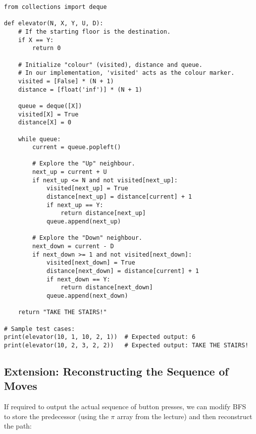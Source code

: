 \documentclass[12pt]{article}
\begin{document}
\begin{lstlisting}
from collections import deque

def elevator(N, X, Y, U, D):
    # If the starting floor is the destination.
    if X == Y:
        return 0
    
    # Initialize "colour" (visited), distance and queue.
    # In our implementation, 'visited' acts as the colour marker.
    visited = [False] * (N + 1)
    distance = [float('inf')] * (N + 1)
    
    queue = deque([X])
    visited[X] = True
    distance[X] = 0
    
    while queue:
        current = queue.popleft()
        
        # Explore the "Up" neighbour.
        next_up = current + U
        if next_up <= N and not visited[next_up]:
            visited[next_up] = True
            distance[next_up] = distance[current] + 1
            if next_up == Y:
                return distance[next_up]
            queue.append(next_up)
        
        # Explore the "Down" neighbour.
        next_down = current - D
        if next_down >= 1 and not visited[next_down]:
            visited[next_down] = True
            distance[next_down] = distance[current] + 1
            if next_down == Y:
                return distance[next_down]
            queue.append(next_down)
    
    return "TAKE THE STAIRS!"

# Sample test cases:
print(elevator(10, 1, 10, 2, 1))  # Expected output: 6
print(elevator(10, 2, 3, 2, 2))   # Expected output: TAKE THE STAIRS!
\end{lstlisting}

\subsection*{Extension: Reconstructing the Sequence of Moves}
If required to output the actual sequence of button presses, we can modify BFS to store the predecessor (using the \(\pi\) array from the lecture) and then reconstruct the path:
\end{document}

